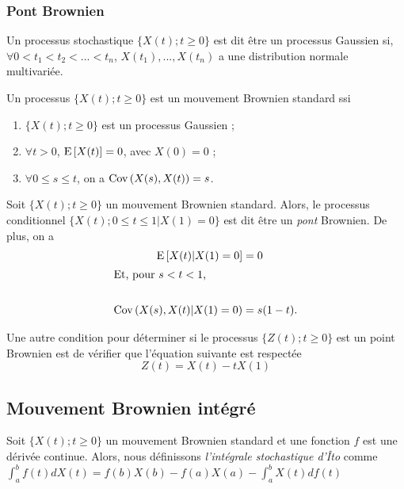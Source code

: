 \documentclass[10pt, french, landscape]{article}
\begin{document}
\begin{multicols*}{3}
\subsubsection*{Pont Brownien}
\begin{definition}
Un processus stochastique $\{X(t) ; t \geq 0 \}$ est dit être un processus Gaussien si, $\forall 0 < t_1 < t_2 < ... < t_n$, $X(t_1), ..., X(t_n)$ a une distribution normale multivariée.
\end{definition}

\begin{definition}
Un processus $\{X(t) ; t \geq 0 \}$ est un mouvement Brownien standard ssi
\begin{enumerate}[label=(\arabic*)]
\item $\{X(t) ; t \geq 0 \}$ est un processus Gaussien ;
\item $\forall t > 0$, $\mathrm{E} \left[ X(t) \right] = 0$, avec $X(0) = 0$ ;
\item $\forall 0 \leq s \leq t$, on a $\mathrm{Cov} \left( X(s), X(t) \right) = s$.
\end{enumerate}
\end{definition}

\begin{definition}
Soit $\{X(t) ; t \geq 0 \}$ un mouvement Brownien standard. Alors, le processus conditionnel $\{X(t) ; 0 \leq t \leq 1 | X(1) = 0 \}$ est dit être un \emph{pont} Brownien.  De plus, on a
\begin{align*}
\mathrm{E} \left[ X(t) | X(1) = 0 \right] & = 0 \\
\shortintertext{Et, pour $s < t < 1$,} \\
\mathrm{Cov} \left( X(s), X(t) | X(1) = 0 \right) & = s(1-t). \\
\end{align*}
\end{definition}
Une autre condition pour déterminer si le processus $\{ Z(t) ; t \geq 0 \}$ est un point Brownien est de vérifier que l'équation suivante est respectée
\[Z(t) = X(t) - t X(1) \]

\subsection*{Mouvement Brownien intégré}
\begin{definition}
Soit $\{X(t) ; t \geq 0 \}$ un mouvement Brownien standard et une fonction $f$ est une dérivée continue. Alors, nous définissons \emph{l'intégrale stochastique d'Îto} comme \\
$\int_{a}^{b} f(t) d X(t) = f(b) X(b) - f(a) X(a) - \int_{a}^{b} X(t) d f(t)$
\end{definition}


\end{multicols*}
\end{document}
